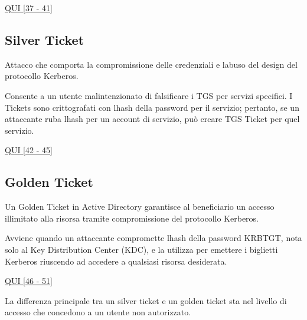 \href{https://virtuale.unibo.it/pluginfile.php/2023963/mod_resource/content/1/Laboratorio\%20di\%20sicurezza\%20dei\%20sistemi\%20informatici\%20e\%20privacy\%20-\%2002\%20Active\%20Directory\%20Security\%20-\%20V1R0.pdf}{\ul{QUI
{[}37 - 41{]}}}

\subsection{Silver Ticket}\label{silver-ticket}

Attacco che comporta la compromissione delle credenziali e
l\textquotesingle abuso del design del protocollo Kerberos.

Consente a un utente malintenzionato di falsificare i TGS per servizi
specifici. I Tickets sono crittografati con l\textquotesingle hash della
password per il servizio; pertanto, se un attaccante ruba
l\textquotesingle hash per un account di servizio, può creare TGS Ticket
per quel servizio.

\href{https://virtuale.unibo.it/pluginfile.php/2023963/mod_resource/content/1/Laboratorio\%20di\%20sicurezza\%20dei\%20sistemi\%20informatici\%20e\%20privacy\%20-\%2002\%20Active\%20Directory\%20Security\%20-\%20V1R0.pdf}{\ul{QUI
{[}42 - 45{]}}}

\subsection{Golden Ticket}\label{golden-ticket}

Un Golden Ticket in Active Directory garantisce al beneficiario un
accesso illimitato alla risorsa tramite compromissione del protocollo
Kerberos.

Avviene quando un attaccante compromette l\textquotesingle hash della
password KRBTGT, nota solo al Key Distribution Center (KDC), e la
utilizza per emettere i biglietti Kerberos riuscendo ad accedere a
qualsiasi risorsa desiderata.

\href{https://virtuale.unibo.it/pluginfile.php/2023963/mod_resource/content/1/Laboratorio\%20di\%20sicurezza\%20dei\%20sistemi\%20informatici\%20e\%20privacy\%20-\%2002\%20Active\%20Directory\%20Security\%20-\%20V1R0.pdf}{\ul{QUI
{[}46 - 51{]}}}

La differenza principale tra un silver ticket e un golden ticket sta nel
livello di accesso che concedono a un utente non autorizzato.

